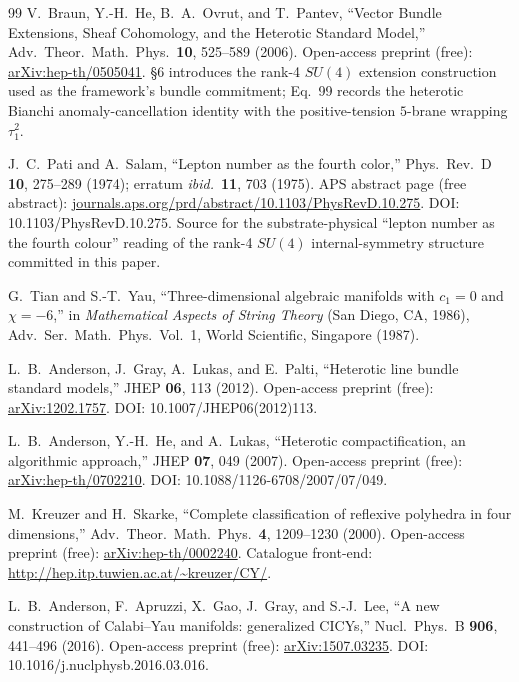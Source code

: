 ﻿\documentclass[reprint,amsmath,amssymb,aps,prd,longbibliography,floatfix]{revtex4-2}
\begin{document}
\begin{thebibliography}{99}
 V.~Braun, Y.-H.~He, B.~A.~Ovrut, and T.~Pantev,
``Vector Bundle Extensions, Sheaf Cohomology, and the Heterotic Standard Model,''
Adv.\ Theor.\ Math.\ Phys.\ \textbf{10}, 525--589 (2006).
Open-access preprint (free): \href{https://arxiv.org/abs/hep-th/0505041}{arXiv:hep-th/0505041}.
\S 6 introduces the rank-4 $SU(4)$ extension construction used as
the framework's bundle commitment; Eq.~99 records the heterotic
Bianchi anomaly-cancellation identity with the positive-tension
$5$-brane wrapping $\tau_1^2$.

 J.~C.~Pati and A.~Salam,
``Lepton number as the fourth color,''
Phys.\ Rev.\ D \textbf{10}, 275--289 (1974);
erratum \emph{ibid.}\ \textbf{11}, 703 (1975).
APS abstract page (free abstract):
\href{https://journals.aps.org/prd/abstract/10.1103/PhysRevD.10.275}{journals.aps.org/prd/abstract/10.1103/PhysRevD.10.275}.
DOI: 10.1103/PhysRevD.10.275. Source for the substrate-physical
``lepton number as the fourth colour'' reading of the rank-4
$SU(4)$ internal-symmetry structure committed in this paper.

 G.~Tian and S.-T.~Yau,
``Three-dimensional algebraic manifolds with $c_1 = 0$ and $\chi = -6$,''
in \emph{Mathematical Aspects of String Theory} (San Diego, CA, 1986),
Adv.\ Ser.\ Math.\ Phys.\ Vol.~1, World Scientific, Singapore (1987).

 L.~B.~Anderson, J.~Gray, A.~Lukas, and E.~Palti,
``Heterotic line bundle standard models,''
JHEP \textbf{06}, 113 (2012).
Open-access preprint (free): \href{https://arxiv.org/abs/1202.1757}{arXiv:1202.1757}.
DOI: 10.1007/JHEP06(2012)113.

 L.~B.~Anderson, Y.-H.~He, and A.~Lukas,
``Heterotic compactification, an algorithmic approach,''
JHEP \textbf{07}, 049 (2007).
Open-access preprint (free): \href{https://arxiv.org/abs/hep-th/0702210}{arXiv:hep-th/0702210}.
DOI: 10.1088/1126-6708/2007/07/049.

 M.~Kreuzer and H.~Skarke,
``Complete classification of reflexive polyhedra in four dimensions,''
Adv.\ Theor.\ Math.\ Phys.\ \textbf{4}, 1209--1230 (2000).
Open-access preprint (free): \href{https://arxiv.org/abs/hep-th/0002240}{arXiv:hep-th/0002240}.
Catalogue front-end: \url{http://hep.itp.tuwien.ac.at/~kreuzer/CY/}.

 L.~B.~Anderson, F.~Apruzzi, X.~Gao, J.~Gray, and S.-J.~Lee,
``A new construction of Calabi--Yau manifolds: generalized CICYs,''
Nucl.\ Phys.\ B \textbf{906}, 441--496 (2016).
Open-access preprint (free): \href{https://arxiv.org/abs/1507.03235}{arXiv:1507.03235}.
DOI: 10.1016/j.nuclphysb.2016.03.016.


\end{thebibliography}
\end{document}
